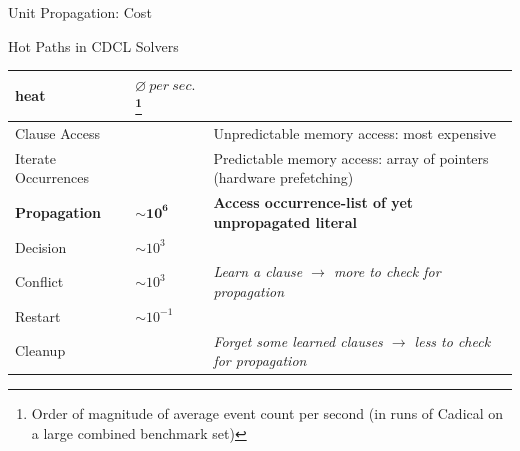 \documentclass[t]{sdqbeamer}
\begin{document}

\begin{frame}{Unit Propagation: Cost}
\begin{block}{Hot Paths in CDCL Solvers}
\renewcommand{\arraystretch}{1.5}
\begin{tabularx}{\linewidth}{l|l|X}
    \bf heat & $\varnothing~per~sec.$\footnote{Order of magnitude of average event count per second (in runs of Cadical on a large combined benchmark set)} & \\
    \hline
    \cellcolor{heat0} Clause Access & & Unpredictable memory access: most expensive\\
    \cellcolor{heat1} Iterate Occurrences & & Predictable memory access: array of pointers (hardware prefetching)\\ 
    \cellcolor{heat2} \bf Propagation & $\mathbf{\sim 10^6}$ & \bf Access occurrence-list of yet unpropagated literal\\
    \hline
    \cellcolor{heat4} Decision & $\sim 10^3$ & \\
    \cellcolor{heat5} Conflict & $\sim 10^3$ & \it Learn a clause $\rightarrow$ more to check for propagation\\
    \cellcolor{heat6} Restart & $\sim 10^{-1}$ & \\
    \cellcolor{heat7} Cleanup & & \it Forget some learned clauses $\rightarrow$ less to check for propagation
\end{tabularx}
\end{block}
\end{frame}
\end{document}
